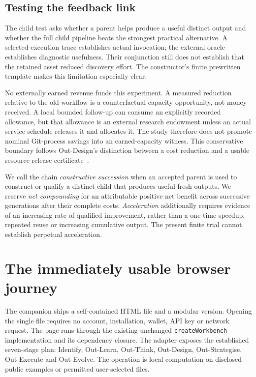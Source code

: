 \documentclass[11pt,a4paper]{article}
\newcommand{\code}[1]{\texttt{\small #1}}
\begin{document}
\subsection{Testing the feedback link}

The child test asks whether a parent helps produce a useful distinct output and whether the full child pipeline beats the strongest practical alternative. A selected-execution trace establishes actual invocation; the external oracle establishes diagnostic usefulness. Their conjunction still does not establish that the retained asset reduced discovery effort. The constructor's finite prewritten template makes this limitation especially clear.

No externally earned revenue funds this experiment. A measured reduction relative to the old workflow is a counterfactual capacity opportunity, not money received. A local bounded follow-up can consume an explicitly recorded allowance, but that allowance is an external research endowment unless an actual service schedule releases it and allocates it. The study therefore does not promote nominal Git-process savings into an earned-capacity witness. This conservative boundary follows Out-Design's distinction between a cost reduction and a usable resource-release certificate~\cite[PDF pp.~5,12--13]{out_design}.



We call the chain \emph{constructive succession} when an accepted parent is used to construct or qualify a distinct child that produces useful fresh outputs. We reserve \emph{net compounding} for an attributable positive net benefit across successive generations after their complete costs. \emph{Acceleration} additionally requires evidence of an increasing rate of qualified improvement, rather than a one-time speedup, repeated reuse or increasing cumulative output. The present finite trial cannot establish perpetual acceleration.

\section{The immediately usable browser journey}
\label{sec:browser}

The companion ships a self-contained HTML file and a modular version. Opening the single file requires no account, installation, wallet, API key or network request. The page runs through the existing unchanged \code{createWorkbench} implementation and its dependency closure. The adapter exposes the established seven-stage plan: Identify, Out-Learn, Out-Think, Out-Design, Out-Strategise, Out-Execute and Out-Evolve. The operation is local computation on disclosed public examples or permitted user-selected files.
\end{document}
